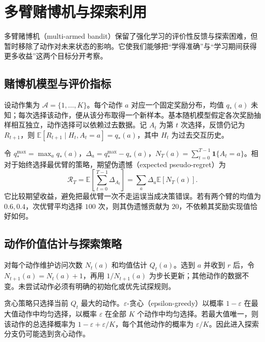 \setcounter{chapter}{2} %
\chapter{多臂赌博机与探索利用}
\label{ch:rl-bandits}

多臂赌博机（multi-armed bandit）保留了强化学习的评价性反馈与探索困难，但暂时移除了动作对未来状态的影响。它使我们能够把“学得准确”与“学习期间获得更多收益”这两个目标分开考察。

\section{赌博机模型与评价指标}

设动作集为 $\mathcal A=\{1,\ldots,K\}$。每个动作 $a$ 对应一个固定奖励分布，均值 $q_*(a)$ 未知；每次选择该动作，便从该分布取得一个新样本。基本随机模型假定各次奖励抽样相互独立，动作选择可以依赖过去数据。记 $A_t$ 为第 $t$ 次选择，反馈仍记为 $R_{t+1}$，则 $\mathbb E[R_{t+1}\mid H_t,A_t=a]=q_*(a)$，其中 $H_t$ 为过去交互历史。

令 $q_*^{\max}=\max_a q_*(a)$，$\Delta_a=q_*^{\max}-q_*(a)$，$N_T(a)=\sum_{t=0}^{T-1}\mathbf1\{A_t=a\}$。相对于始终选择最优臂的策略，期望伪遗憾（expected pseudo-regret）为
\begin{equation}
\mathcal R_T=\mathbb E\!\left[\sum_{t=0}^{T-1}\Delta_{A_t}\right]
=\sum_a\Delta_a\mathbb E[N_T(a)].
\label{eq:rl-bandit-regret}
\end{equation}
它比较期望收益，避免把最优臂一次不走运误当成决策错误。若有两个臂的均值为 $0.6,0.4$，次优臂平均选择 $100$ 次，则其伪遗憾贡献为 $20$，不依赖其奖励实现值恰好如何。

\section{动作价值估计与探索策略}

对每个动作维护访问次数 $N_t(a)$ 和均值估计 $Q_t(a)$。选到 $a$ 并收到 $r$ 后，令 $N_{t+1}(a)=N_t(a)+1$，再用 $1/N_{t+1}(a)$ 为步长更新；其他动作的数据不变。未尝试动作必须有明确的初始化或优先试探规则。

贪心策略只选择当前 $Q_t$ 最大的动作。$\varepsilon$-贪心（epsilon-greedy）以概率 $1-\varepsilon$ 在最大值动作中均匀选择，以概率 $\varepsilon$ 在全部 $K$ 个动作中均匀选择。若最大值唯一，则该动作的总选择概率为 $1-\varepsilon+\varepsilon/K$，每个其他动作的概率为 $\varepsilon/K$。因此进入探索分支仍可能选到贪心动作。

